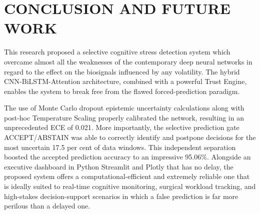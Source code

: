 \documentclass[conference,a4paper]{IEEEtran}
\begin{document}
\begin{table}[htbp]
\renewcommand{\arraystretch}{1.4}
\caption{Risk-Coverage Trade-off Under Selective Prediction}
\label{tab:selective}
\begin{center}
\end{center}
\end{table}

\section{CONCLUSION AND FUTURE WORK}
This research proposed a selective cognitive stress detection system which overcame almost all the weaknesses of the contemporary deep neural networks in regard to the effect on the biosignals influenced by any volatility. The hybrid CNN-BiLSTM-Attention architecture, combined with a powerful Trust Engine, enables the system to break free from the flawed forced-prediction paradigm. 

The use of Monte Carlo dropout epistemic uncertainty calculations along with post-hoc Temperature Scaling properly calibrated the network, resulting in an unprecedented ECE of 0.021. More importantly, the selective prediction gate ACCEPT/ABSTAIN was able to correctly identify and postpone decisions for the most uncertain 17.5 per cent of data windows. This independent separation boosted the accepted prediction accuracy to an impressive 95.06\%. Alongside an executive dashboard in Python Streamlit and Plotly that has no delay, the proposed system offers a computational-efficient and extremely reliable one that is ideally suited to real-time cognitive monitoring, surgical workload tracking, and high-stakes decision-support scenarios in which a false prediction is far more perilous than a delayed one.
\end{document}
